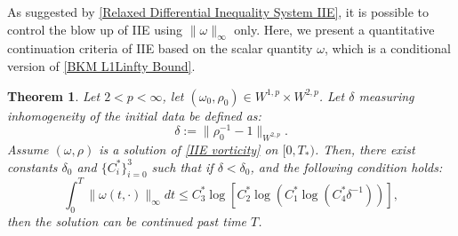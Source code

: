 \documentclass[12pt,letterpaper]{article}
\newtheorem{thm}{Theorem}[section]
\theoremstyle{plain}
\begin{document}
As suggested by \eqref{Relaxed Differential Inequality System IIE}, it is possible to control the blow up of IIE using $\lVert\omega\rVert_\infty$ only. Here, we present a quantitative continuation criteria of IIE based on the scalar quantity $\omega$, which is a 
 conditional version of \eqref{BKM L1Linfty Bound}.


\begin{thm}\label{Control of Energy Norm II}
Let $2<p<\infty$, let $(\omega_0,\rho_0)\in W^{1,p}\times W^{2,p}$. Let $\delta$ measuring inhomogeneity of the initial data be defined as:
\begin{equation*}
\delta:=\lVert\rho_0^{-1}-1\rVert_{W^{2,p}}  .  
\end{equation*}
Assume $(\omega,\rho)$ is a solution of \eqref{IIE vorticity} on $[0,T_*)$. Then, there exist constants $\delta_0$ and $\{C_i^*\}_{i=0}^3$ such that if $\delta<\delta_0$, and the following condition holds:
\begin{equation}\label{Quantitative Bound of vorticity integral}
 \int_0^{T} \lVert\omega(t,\cdot)\rVert_\infty dt \le C_3^*\log [C_2^* \log  (C_1^*\log ({C_4^*\delta^{-1}}) )],  
\end{equation}
then the solution can be continued past time $T$.
\end{thm}
\end{document}
